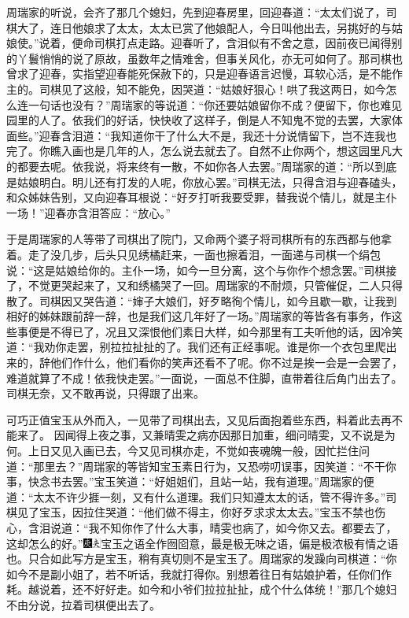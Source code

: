 周瑞家的听说，会齐了那几个媳妇，先到迎春房里，回迎春道：``太太们说了，司棋大了，连日他娘求了太太，太太已赏了他娘配人，今日叫他出去，另挑好的与姑娘使。''说着，便命司棋打点走路。迎春听了，含泪似有不舍之意，因前夜已闻得别的丫鬟悄悄的说了原故，虽数年之情难舍，但事关风化，亦无可如何了。那司棋也曾求了迎春，实指望迎春能死保赦下的，只是迎春语言迟慢，耳软心活，是不能作主的。司棋见了这般，知不能免，因哭道：``姑娘好狠心！哄了我这两日，如今怎么连一句话也没有？''周瑞家的等说道：``你还要姑娘留你不成？便留下，你也难见园里的人了。依我们的好话，快快收了这样子，倒是人不知鬼不觉的去罢，大家体面些。''迎春含泪道：``我知道你干了什么大不是，我还十分说情留下，岂不连我也完了。你瞧入画也是几年的人，怎么说去就去了。自然不止你两个，想这园里凡大的都要去呢。依我说，将来终有一散，不如你各人去罢。''周瑞家的道：``所以到底是姑娘明白。明儿还有打发的人呢，你放心罢。''司棋无法，只得含泪与迎春磕头，和众姊妹告别，又向迎春耳根说：``好歹打听我要受罪，替我说个情儿，就是主仆一场！''迎春亦含泪答应：``放心。''

于是周瑞家的人等带了司棋出了院门，又命两个婆子将司棋所有的东西都与他拿着。走了没几步，后头只见绣橘赶来，一面也擦着泪，一面递与司棋一个绢包说：``这是姑娘给你的。主仆一场，如今一旦分离，这个与你作个想念罢。''司棋接了，不觉更哭起来了，又和绣橘哭了一回。周瑞家的不耐烦，只管催促，二人只得散了。司棋因又哭告道：``婶子大娘们，好歹略徇个情儿，如今且歇一歇，让我到相好的姊妹跟前辞一辞，也是我们这几年好了一场。''周瑞家的等皆各有事务，作这些事便是不得已了，况且又深恨他们素日大样，如今那里有工夫听他的话，因冷笑道：``我劝你走罢，别拉拉扯扯的了。我们还有正经事呢。谁是你一个衣包里爬出来的，辞他们作什么，他们看你的笑声还看不了呢。你不过是挨一会是一会罢了，难道就算了不成！依我快走罢。''一面说，一面总不住脚，直带着往后角门出去了。司棋无奈，又不敢再说，只得跟了出来。

可巧正值宝玉从外而入，一见带了司棋出去，又见后面抱着些东西，料着此去再不能来了。
因闻得上夜之事，又兼晴雯之病亦因那日加重，细问晴雯，又不说是为何。上日又见入画已去，今又见司棋亦走，不觉如丧魂魄一般，因忙拦住问道：``那里去？''周瑞家的等皆知宝玉素日行为，又恐唠叨误事，因笑道：``不干你事，快念书去罢。''宝玉笑道：``好姐姐们，且站一站，我有道理。''周瑞家的便道：``太太不许少捱一刻，又有什么道理。我们只知遵太太的话，管不得许多。''司棋见了宝玉，因拉住哭道：``他们做不得主，你好歹求求太太去。''宝玉不禁也伤心，含泪说道：``我不知你作了什么大事，晴雯也病了，如今你又去。都要去了，这却怎么的好。''{\includegraphics[width=3mm]{../Images/00004}\includegraphics[width=3mm]{../Images/00012}\footnotesize \kaishu 宝玉之语全作囫囵意，最是极无味之语，偏是极浓极有情之语也。只合如此写方是宝玉，稍有真切则不是宝玉了。}周瑞家的发躁向司棋道：``你如今不是副小姐了，若不听话，我就打得你。别想着往日有姑娘护着，任你们作耗。越说着，还不好好走。如今和小爷们拉拉扯扯，成个什么体统！''那几个媳妇不由分说，拉着司棋便出去了。

